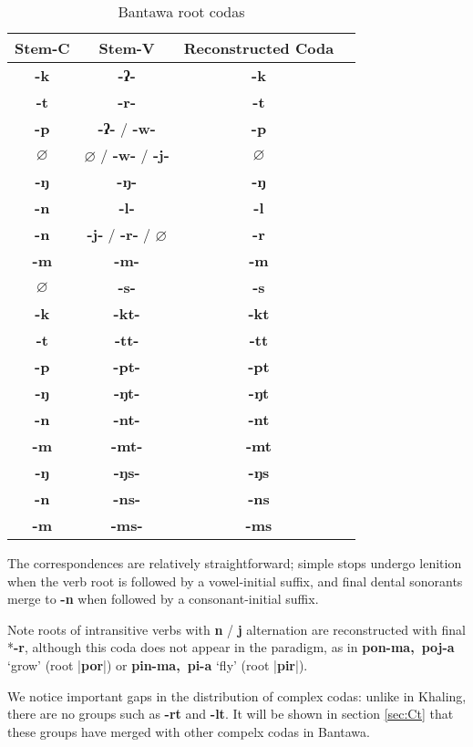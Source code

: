 \documentclass[oldfontcommands,oneside,a4paper,11pt]{article}
\newcommand{\ipa}[1]{\textbf{{\phon\mbox{#1}}}} %
\begin{document}
\begin{table}[h]
\caption{Bantawa root codas} \centering \label{tab:bantawa.root}
\begin{tabular}{cccc}
\toprule
Stem-C & Stem-V & Reconstructed Coda \\
\midrule
\ipa{-k} & \ipa{-ʔ-} & \ipa{-k} \\
\ipa{-t} & \ipa{-r-} & \ipa{-t} \\
\ipa{-p} & \ipa{-ʔ-} /  \ipa{-w-} & \ipa{-p} \\
$\varnothing$ & $\varnothing$ / \ipa{-w-} / \ipa{-j-} & $\varnothing$ \\
\ipa{-ŋ} & \ipa{-ŋ-} & \ipa{-ŋ} \\
\ipa{-n} & \ipa{-l-} & \ipa{-l} \\
\ipa{-n} & \ipa{-j-} / \ipa{-r-} / $\varnothing$ & \ipa{-r} \\
\ipa{-m} & \ipa{-m-} & \ipa{-m} \\
$\varnothing$ & \ipa{-s-} & \ipa{-s} \\
\midrule
\ipa{-k} & \ipa{-kt-} & \ipa{-kt} \\
\ipa{-t} & \ipa{-tt-} & \ipa{-tt} \\
\ipa{-p} & \ipa{-pt-} & \ipa{-pt} \\
\ipa{-ŋ} & \ipa{-ŋt-} & \ipa{-ŋt} \\
\ipa{-n} & \ipa{-nt-} & \ipa{-nt} \\
\ipa{-m} & \ipa{-mt-} & \ipa{-mt} \\
\midrule
\ipa{-ŋ} & \ipa{-ŋs-} & \ipa{-ŋs}  \\
\ipa{-n} & \ipa{-ns-} & \ipa{-ns} \\
\ipa{-m} & \ipa{-ms-} & \ipa{-ms}   \\
\bottomrule
\end{tabular}
\end{table}

The correspondences are relatively straightforward; simple stops undergo lenition when the verb root is followed by a vowel-initial suffix, and final dental sonorants merge to \ipa{-n} when followed by a consonant-initial suffix. 

Note roots of intransitive verbs with \ipa{n} / \ipa{j} alternation are reconstructed with final *\ipa{-r}, although this coda does not appear in the paradigm, as in \ipa{pon-ma, poj-a} `grow' (root |\ipa{por}|) or \ipa{pin-ma, pi-a} `fly' (root |\ipa{pir}|).

We notice important gaps in the distribution of complex codas: unlike in Khaling, there are no groups such as \ipa{-rt} and \ipa{-lt}. It will be shown in section \ref{sec:Ct} that these groups have merged with other compelx codas in Bantawa.
\end{document}
